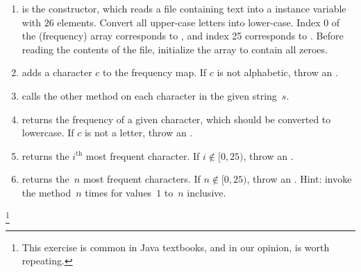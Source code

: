\begin{enumerate}[label=(\alph*)]
    \item {} is the constructor, which reads a file containing text into a  instance variable with $26$ elements. Convert all upper-case letters into lower-case. Index 0 of the (frequency) array corresponds to , and index 25 corresponds to . Before reading the contents of the file, initialize the array to contain all zeroes.
    \item {} adds a character $c$ to the frequency map. If $c$ is not alphabetic, throw an .
    \item {} calls the other  method on each character in the given string~$s$.
    \item {} returns the frequency of a given character, which should be converted to lowercase. If $c$ is not a letter, throw an .
    \item {} returns the $i^\text{th}$ most frequent character. If $i \not\in [0, 25)$, throw an .
    \item {} returns the~$n$ most frequent characters. If $n \not\in [0, 25)$, throw an . Hint: invoke the  method~$n$ times for values~$1$ to~$n$ inclusive.
\end{enumerate}

\footnote{This exercise is common in Java textbooks, and in our opinion, is worth repeating.}

